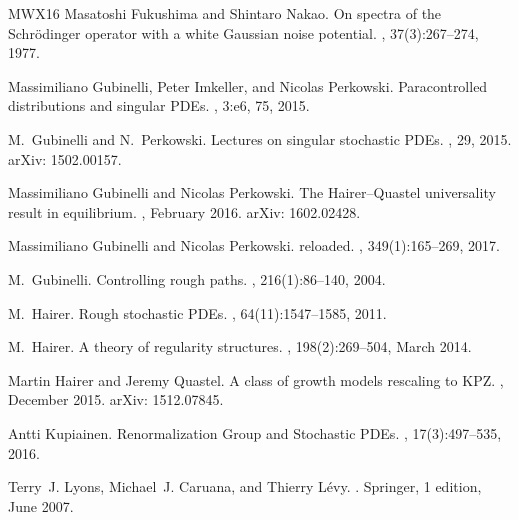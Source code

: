 \documentclass[a4paper, 11pt]{article}
\begin{document}
\begin{thebibliography}{MWX16}
Masatoshi Fukushima and Shintaro Nakao.
\newblock On spectra of the {S}chr{\"o}dinger operator with a white {G}aussian
  noise potential.
, 37(3):267--274, 1977.

Massimiliano Gubinelli, Peter Imkeller, and Nicolas Perkowski.
\newblock Paracontrolled distributions and singular {PDEs}.
, 3:e6, 75, 2015.

M.~Gubinelli and N.~Perkowski.
\newblock Lectures on singular stochastic {PDEs}.
, 29, 2015.
\newblock arXiv: 1502.00157.

Massimiliano Gubinelli and Nicolas Perkowski.
\newblock The {Hairer}--{Quastel} universality result in equilibrium.
, February 2016.
\newblock arXiv: 1602.02428.

Massimiliano Gubinelli and Nicolas Perkowski.
 reloaded.
, 349(1):165--269, 2017.

M.~Gubinelli.
\newblock Controlling rough paths.
, 216(1):86--140, 2004.

M.~Hairer.
\newblock Rough stochastic {PDEs}.
,
  64(11):1547--1585, 2011.

M.~Hairer.
\newblock A theory of regularity structures.
, 198(2):269--504, March 2014.

Martin Hairer and Jeremy Quastel.
\newblock A class of growth models rescaling to {KPZ}.
, December 2015.
\newblock arXiv: 1512.07845.

Antti Kupiainen.
\newblock Renormalization {Group} and {Stochastic} {PDEs}.
, 17(3):497--535, 2016.

Terry~J. Lyons, Michael~J. Caruana, and Thierry Lévy.
.
\newblock Springer, 1 edition, June 2007.


\end{thebibliography}
\end{document}
